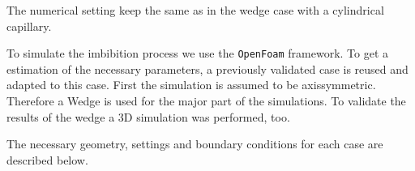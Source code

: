 The numerical setting keep the same as in the wedge case with a cylindrical capillary. 


To simulate the imbibition process we use the \verb|OpenFoam| framework. To get a estimation of the necessary parameters, a previously validated case is reused and adapted to this case. First the simulation is assumed to be axissymmetric. Therefore a Wedge is used for the major part of the simulations. To validate the results of the wedge a 3D simulation was performed, too. 

The necessary geometry, settings and boundary conditions for each case are described below. 
